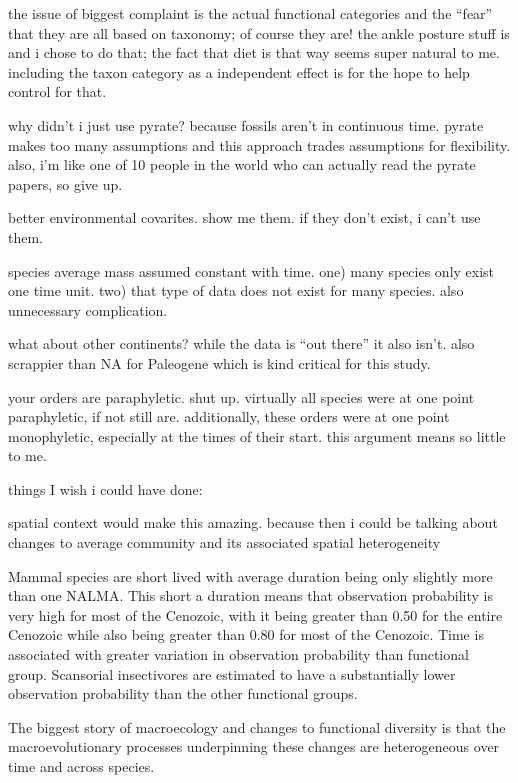 \documentclass[12pt,letterpaper]{article}
\begin{document}
the issue of biggest complaint is the actual functional categories and the ``fear'' that they are all based on taxonomy; of course they are! the ankle posture stuff is and i chose to do that; the fact that diet is that way seems super natural to me. including the taxon category as a independent effect is for the hope to help control for that. 

why didn't i just use pyrate? because fossils aren't in continuous time. pyrate makes too many assumptions and this approach trades assumptions for flexibility. also, i'm like one of 10 people in the world who can actually read the pyrate papers, so give up.

better environmental covarites. show me them. if they don't exist, i can't use them.

species average mass assumed constant with time. one) many species only exist one time unit. two) that type of data does not exist for many species. also unnecessary complication.

what about other continents? while the data is ``out there'' it also isn't. also scrappier than NA for Paleogene which is kind critical for this study.

your orders are paraphyletic. shut up. virtually all species were at one point paraphyletic, if not still are. additionally, these orders were at one point monophyletic, especially at the times of their start. this argument means so little to me.



things I wish i could have done:

spatial context would make this amazing. because then i could be talking about changes to average community and its associated spatial heterogeneity






Mammal species are short lived with average duration being only slightly more than one NALMA. This short a duration means that observation probability is very high for most of the Cenozoic, with it being greater than 0.50 for the entire Cenozoic while also being greater than 0.80 for most of the Cenozoic. Time is associated with greater variation in observation probability than functional group. Scansorial insectivores are estimated to have a substantially lower observation probability than the other functional groups.


The biggest story of macroecology and changes to functional diversity is that the macroevolutionary processes underpinning these changes are heterogeneous over time and across species. 
\end{document}
